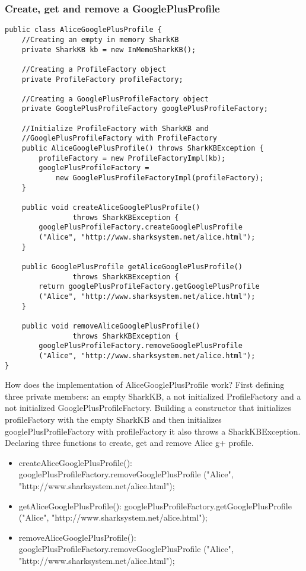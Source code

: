 \documentclass[12pt]{article}
\begin{document}
\subsubsection{Create, get and remove a GooglePlusProfile}

\begin{verbatim}
public class AliceGooglePlusProfile {
    //Creating an empty in memory SharkKB
    private SharkKB kb = new InMemoSharkKB();

    //Creating a ProfileFactory object
    private ProfileFactory profileFactory;

    //Creating a GooglePlusProfileFactory object
    private GooglePlusProfileFactory googlePlusProfileFactory;

    //Initialize ProfileFactory with SharkKB and
    //GooglePlusProfileFactory with ProfileFactory
    public AliceGooglePlusProfile() throws SharkKBException {
        profileFactory = new ProfileFactoryImpl(kb);
        googlePlusProfileFactory =
            new GooglePlusProfileFactoryImpl(profileFactory);
    }

    public void createAliceGooglePlusProfile()
                throws SharkKBException {
        googlePlusProfileFactory.createGooglePlusProfile
        ("Alice", "http://www.sharksystem.net/alice.html");
    }

    public GooglePlusProfile getAliceGooglePlusProfile()
                throws SharkKBException {
        return googlePlusProfileFactory.getGooglePlusProfile
        ("Alice", "http://www.sharksystem.net/alice.html");
    }

    public void removeAliceGooglePlusProfile()
                throws SharkKBException {
        googlePlusProfileFactory.removeGooglePlusProfile
        ("Alice", "http://www.sharksystem.net/alice.html");
}
\end{verbatim}

How does the implementation of AliceGooglePlusProfile work? First defining three private members: an empty SharkKB, a not initialized ProfileFactory and a not initialized GooglePlusProfileFactory. Building a constructor that initializes profileFactory with the empty SharkKB and then initializes googlePlusProfileFactory with profileFactory it also throws a SharkKBException. Declaring three functions to create, get and remove Alice g+ profile.

\begin{itemize}
  \item createAliceGooglePlusProfile(): googlePlusProfileFactory.removeGooglePlusProfile ("Alice", "http://www.sharksystem.net/alice.html");
  \item getAliceGooglePlusProfile(): googlePlusProfileFactory.getGooglePlusProfile ("Alice", "http://www.sharksystem.net/alice.html");
  \item removeAliceGooglePlusProfile(): googlePlusProfileFactory.removeGooglePlusProfile ("Alice", "http://www.sharksystem.net/alice.html");
\end{itemize}
\end{document}
